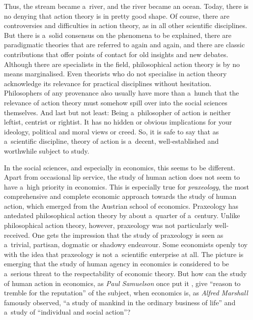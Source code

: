  Thus, the stream became a~river, and the river became an ocean. Today, there is no denying that action theory is in pretty good shape. Of course, there are controversies and difficulties in action theory, as in all other scientific disciplines. But there is a~solid consensus on the phenomena to be explained, there are paradigmatic theories that are referred to again and again, and there are classic contributions that offer points of contact for old insights and new debates. Although there are specialists in the field, philosophical action theory is by no means marginalised. Even theorists who do not specialise in action theory acknowledge its relevance for practical disciplines without hesitation. Philosophers of any provenance also usually have more than a~hunch that the relevance of action theory must somehow spill over into the social sciences themselves. And last but not least: Being a~philosopher of action is neither leftist, centrist or rightist. It has no hidden or obvious implications for your ideology, political and moral views or creed. So, it is safe to say that as a~scientific discipline, theory of action is a~decent, well-established and worthwhile subject to study.



In the social sciences, and especially in economics, this seems to be different. Apart from occasional lip service, the study of human action does not seem to have a~high priority in economics. This is especially true for \textit{praxeology}, the most comprehensive and complete economic approach towards the study of human action, which emerged from the Austrian school of economics. Praxeology has antedated philosophical action theory by about a~quarter of a~century. Unlike philosophical action theory, however, praxeology was not particularly well-received. One gets the impression that the study of praxeology is seen as a~trivial, partisan, dogmatic or shadowy endeavour. Some economists openly toy with the idea that praxeology is not a~scientific enterprise at all. The picture is emerging that the study of human agency in economics is considered to be a~serious threat to the respectability of economic theory. But how can the study of human action in economics, as \textit{Paul Samuelson} once put it 
\parencite*[][p.736]{}, %
 give ``reason to tremble for the reputation'' of the subject, when economics is, as \textit{Alfred Marshall} 
\parencite*[][p.1]{marshall_principles_1890} %
 famously observed, ``a study of mankind in the ordinary business of life'' and a~study of ``individual and social action''?



